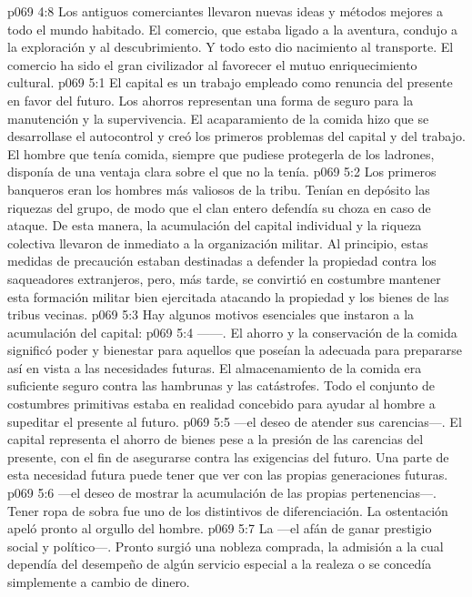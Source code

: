 \vs p069 4:8 Los antiguos comerciantes llevaron nuevas ideas y métodos mejores a todo el mundo habitado. El comercio, que estaba ligado a la aventura, condujo a la exploración y al descubrimiento. Y todo esto dio nacimiento al transporte. El comercio ha sido el gran civilizador al favorecer el mutuo enriquecimiento cultural.
\vs p069 5:1 El capital es un trabajo empleado como renuncia del presente en favor del futuro. Los ahorros representan una forma de seguro para la manutención y la supervivencia. El acaparamiento de la comida hizo que se desarrollase el autocontrol y creó los primeros problemas del capital y del trabajo. El hombre que tenía comida, siempre que pudiese protegerla de los ladrones, disponía de una ventaja clara sobre el que no la tenía.
\vs p069 5:2 Los primeros banqueros eran los hombres más valiosos de la tribu. Tenían en depósito las riquezas del grupo, de modo que el clan entero defendía su choza en caso de ataque. De esta manera, la acumulación del capital individual y la riqueza colectiva llevaron de inmediato a la organización militar. Al principio, estas medidas de precaución estaban destinadas a defender la propiedad contra los saqueadores extranjeros, pero, más tarde, se convirtió en costumbre mantener esta formación militar bien ejercitada atacando la propiedad y los bienes de las tribus vecinas.
\vs p069 5:3 Hay algunos motivos esenciales que instaron a la acumulación del capital:
\vs p069 5:4  ------. El ahorro y la conservación de la comida significó poder y bienestar para aquellos que poseían la adecuada  para prepararse así en vista a las necesidades futuras. El almacenamiento de la comida era suficiente seguro contra las hambrunas y las catástrofes. Todo el conjunto de costumbres primitivas estaba en realidad concebido para ayudar al hombre a supeditar el presente al futuro.
\vs p069 5:5  ---el deseo de atender sus carencias---. El capital representa el ahorro de bienes pese a la presión de las carencias del presente, con el fin de asegurarse contra las exigencias del futuro. Una parte de esta necesidad futura puede tener que ver con las propias generaciones futuras.
\vs p069 5:6  ---el deseo de mostrar la acumulación de las propias pertenencias---. Tener ropa de sobra fue uno de los distintivos de diferenciación. La ostentación apeló pronto al orgullo del hombre.
\vs p069 5:7 La  ---el afán de ganar prestigio social y político---. Pronto surgió una nobleza comprada, la admisión a la cual dependía del desempeño de algún servicio especial a la realeza o se concedía simplemente a cambio de dinero.
